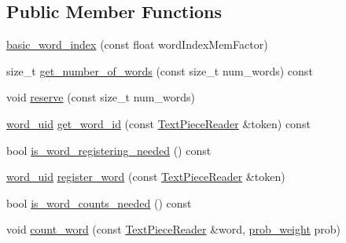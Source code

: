 \subsection*{Public Member Functions}
\begin{DoxyCompactItemize}
\item 
\hyperlink{classuva_1_1smt_1_1bpbd_1_1server_1_1lm_1_1dictionary_1_1basic__word__index_aadbe4d52e8364df91f242e6f9fd86234}{basic\+\_\+word\+\_\+index} (const float word\+Index\+Mem\+Factor)
\item 
size\+\_\+t \hyperlink{classuva_1_1smt_1_1bpbd_1_1server_1_1lm_1_1dictionary_1_1basic__word__index_a2e6562b6e3c323bc626d9301cf196cf7}{get\+\_\+number\+\_\+of\+\_\+words} (const size\+\_\+t num\+\_\+words) const 
\item 
void \hyperlink{classuva_1_1smt_1_1bpbd_1_1server_1_1lm_1_1dictionary_1_1basic__word__index_a277ab4195560f7760caba857109d64a5}{reserve} (const size\+\_\+t num\+\_\+words)
\item 
\hyperlink{namespaceuva_1_1smt_1_1bpbd_1_1server_a6bfe45ba344d65a7fdd7d26156328ddc}{word\+\_\+uid} \hyperlink{classuva_1_1smt_1_1bpbd_1_1server_1_1lm_1_1dictionary_1_1basic__word__index_acffe24fc47da578fa203fa649a1dce8a}{get\+\_\+word\+\_\+id} (const \hyperlink{classuva_1_1utils_1_1file_1_1_text_piece_reader}{Text\+Piece\+Reader} \&token) const 
\item 
bool \hyperlink{classuva_1_1smt_1_1bpbd_1_1server_1_1lm_1_1dictionary_1_1basic__word__index_a60b55124e8f0fea219dff9ca76fdf51a}{is\+\_\+word\+\_\+registering\+\_\+needed} () const 
\item 
\hyperlink{namespaceuva_1_1smt_1_1bpbd_1_1server_a6bfe45ba344d65a7fdd7d26156328ddc}{word\+\_\+uid} \hyperlink{classuva_1_1smt_1_1bpbd_1_1server_1_1lm_1_1dictionary_1_1basic__word__index_a365ee49bb8d0685f47eec8be4149611a}{register\+\_\+word} (const \hyperlink{classuva_1_1utils_1_1file_1_1_text_piece_reader}{Text\+Piece\+Reader} \&token)
\item 
bool \hyperlink{classuva_1_1smt_1_1bpbd_1_1server_1_1lm_1_1dictionary_1_1basic__word__index_a4f13e6413dd71a283d391a98a6949c55}{is\+\_\+word\+\_\+counts\+\_\+needed} () const 
\item 
void \hyperlink{classuva_1_1smt_1_1bpbd_1_1server_1_1lm_1_1dictionary_1_1basic__word__index_a50ebfbe44aac2c6f0fba345309a1fc7a}{count\+\_\+word} (const \hyperlink{classuva_1_1utils_1_1file_1_1_text_piece_reader}{Text\+Piece\+Reader} \&word, \hyperlink{namespaceuva_1_1smt_1_1bpbd_1_1server_a01e9ea4de9c226f4464862e84ff0bbcc}{prob\+\_\+weight} prob)

\end{DoxyCompactItemize}
